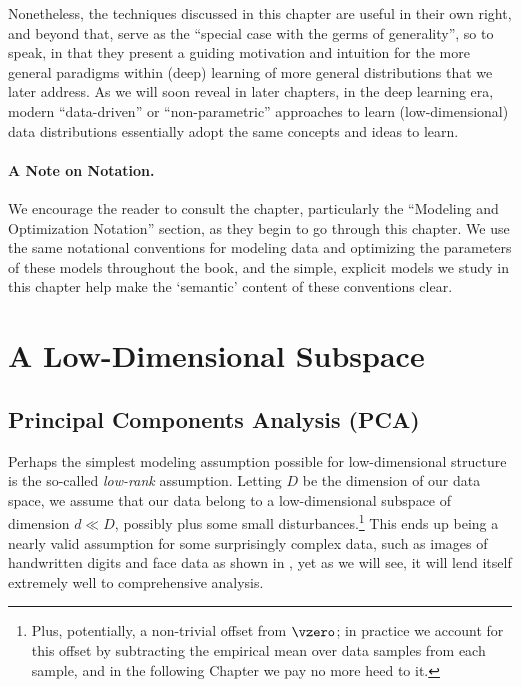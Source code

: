 \documentclass[../../book-main.tex]{subfiles}
\begin{document}
Nonetheless, the techniques discussed in this chapter are useful in
their own right, and beyond that, serve as the ``special case with
the germs of generality'', so to speak, in that they present a guiding
motivation and intuition for the more general paradigms within (deep)
learning of more general distributions that we later address. As we
will soon reveal in later chapters, in the deep learning era, modern
``data-driven'' or ``non-parametric'' approaches to learn
(low-dimensional) data distributions essentially adopt the same
concepts and ideas to learn.

\paragraph{A Note on Notation.} We encourage the reader to consult
the  chapter, particularly the ``Modeling and
Optimization Notation''
section, as they begin to go through this chapter. We use the same notational
conventions for modeling data and optimizing the parameters of these models
throughout the book, and the simple, explicit models we study in this chapter
help make the `semantic' content of these conventions clear.

\section{A Low-Dimensional Subspace} \label{sec:lowrank}

\subsection{Principal Components Analysis (PCA)}\label{sub:pca}

Perhaps the simplest modeling assumption possible for low-dimensional structure
is the so-called \textit{low-rank} assumption. Letting \(D\) be the dimension of
our data space, we assume that our data belong to a low-dimensional
subspace of dimension \(d \ll D\), possibly plus some small
disturbances.\footnote{Plus, potentially, a non-trivial offset from
    \(\vzero\); in practice we account for this offset by subtracting the
    empirical mean over data samples from each sample, and in the
following Chapter we pay no more heed to it.} This ends up
being a nearly valid assumption for some
surprisingly complex data, such as images of handwritten digits and
face data \cite{BasriR2003-PAMI} as shown in ,
yet as we will see, it will lend itself extremely well to
comprehensive analysis.
\end{document}
